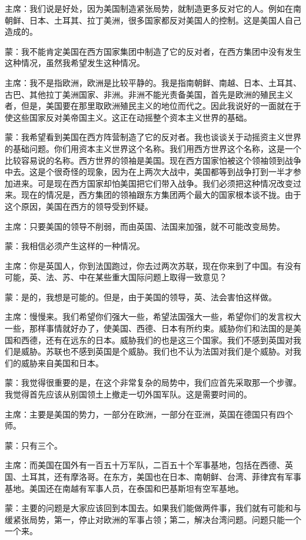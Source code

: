 主席：我们说是好处，因为美国制造紧张局势，就制造更多反对它的人。例如在南朝鲜、日本、土耳其、拉丁美洲，很多国家都反对美国人的控制。这是美国人自己造成的。

蒙：我不能肯定美国在西方国家集团中制造了它的反对者，在西方集团中没有发生这种情况，虽然我希望发生这种情况。

主席：我不是指欧洲，欧洲是比较平静的。我是指南朝鲜、南越、日本、土耳其、古巴、其他拉丁美洲国家、非洲。非洲不能光责备美国，首先是欧洲的殖民主义者，但是，美国要在那里取欧洲殖民主义的地位而代之。因此我说好的一面就在于使这些国家反对美帝国主义。这正在动摇整个资本主义世界的基础。

蒙：我希望看到美国在西方阵营制造了它的反对者。我也谈谈关于动摇资主义世界的基础问题。你们用资本主义世界这个名称。我们用西方世界这个名称，这是一个比较容易说的名称。西方世界的领袖是美国。现在西方国家怕被这个领袖领到战争中去。这是个很奇怪的现象，因为在上两次大战中，美国都等到战争打到一半才参加进来。可是现在西方国家却怕美国把它们带入战争。我们必须把这种情况改变过来。现在的情况是，西方集团的领袖跟东方集团两个最大的国家根本谈不拢。由于这个原因，美国在西方的领导受到怀疑。

主席：只要美国的领导不削弱，而由英国、法国来加强，就不可能改变局势。

蒙：我相信必须产生这样的一种情况。

主席：你是英国人，你到法国跑过，你去过两次苏联，现在你来到了中国。有没有可能，英、法、苏、中在某些重大国际问题上取得一致意见？

蒙：是的，我想是可能的。但是，由于美国的领导，英、法会害怕这样做。

主席：慢慢来。我们希望你们强大一些，希望法国强大一些，希望你们的发言权大一些，那样事情就好办了，使美国、西德、日本有所约束。威胁你们和法国的是美国和西德，还有在远东的日本。威胁我们的也是这三个国家。我们不感到英国对我们是威胁。苏联也不感到英国是个威胁。我们也不认为法国对我们是个威胁。对我们的威胁来自美国和日本。

蒙：我觉得很重要的是，在这个非常复杂的局势中，我们应首先采取那一个步骤。我觉得首先应该从别国领土上撤走一切外国军队。这是需要时间的。

主席：主要是美国的势力，一部分在欧洲，一部分在亚洲，英国在德国只有四个师。

蒙：只有三个。

主席：而美国在国外有一百五十万军队，二百五十个军事基地，包括在西德、英国、土耳其，还有摩洛哥。在东方，美国也在日本、南朝鲜、台湾、菲律宾有军事基地。美国还在南越有军事人员，在泰国和巴基斯坦有空军基地。

蒙：主要的问题是大家应该回到本国去。如果我们能做两件事，我们就有可能和与缓紧张局势，第一，停止对欧洲的军事占领；第二，解决台湾问题。问题只能一个一个来。

